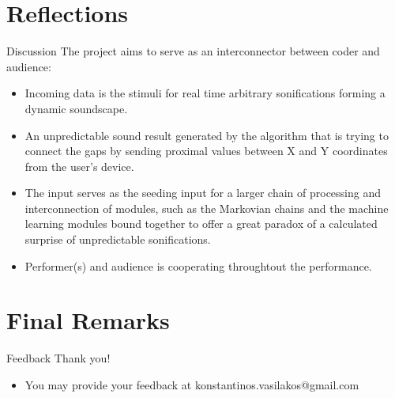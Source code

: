 \documentclass[t, 10pt, seahorse, bigger]{beamer}
\begin{document}
\section{Reflections}
\label{sec:orga7678fa}
\begin{frame}[label={sec:org60aa2c8}]{Discussion}
The project aims to serve as an interconnector between coder and audience:

\begin{itemize}
\item Incoming data is the stimuli for real time arbitrary sonifications forming a dynamic soundscape.

\item An unpredictable sound result generated by the algorithm that is trying to connect the gaps by sending proximal values between X and Y coordinates from the user's device.

\item The input serves as the seeding input for a larger chain of processing and interconnection of modules, such as the Markovian chains and the machine learning modules bound together to offer a great paradox of a calculated surprise of unpredictable sonifications.

\item Performer(s) and audience is cooperating throughtout the performance.
\end{itemize}
\end{frame}
\section{Final Remarks}
\label{sec:orgf74fb88}
\begin{frame}[label={sec:org91a7b52}]{Feedback}
Thank you!

\begin{itemize}
\item You may provide your feedback at konstantinos.vasilakos@gmail.com
\end{itemize}
\end{frame}
\end{document}
